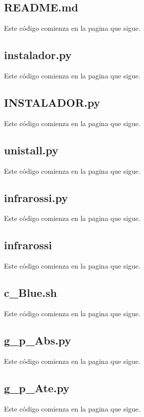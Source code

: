 \documentclass[12]{article}
\begin{document}
\subsection{README.md}
Este código comienza en la pagina que sigue.
 
\subsection{instalador.py}
Este código comienza en la pagina que sigue.
 
\subsection{INSTALADOR.py}
Este código comienza en la pagina que sigue.

\subsection{unistall.py}
Este código comienza en la pagina que sigue.

\subsection{infrarossi.py} \label{infrarossi}
Este código comienza en la pagina que sigue.
  
\subsection{infrarossi}
Este código comienza en la pagina que sigue.

\subsection{c\_Blue.sh}
Este código comienza en la pagina que sigue.
  
\subsection{g\_p\_Abs.py}
Este código comienza en la pagina que sigue.
    
\subsection{g\_p\_Ate.py}
Este código comienza en la pagina que sigue.
 
\end{document}
